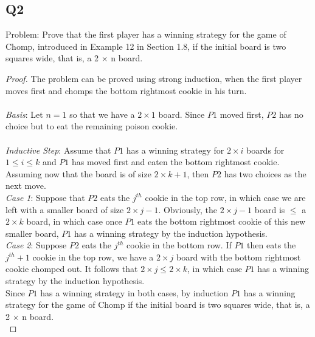 \documentclass[12pt, oneside]{article}
\begin{document}
\subsection*{Q2}
Problem: Prove that the first player has a winning strategy for the
game of Chomp, introduced in Example 12 in Section 1.8,
if the initial board is two squares wide, that is, a 2 $\times$ n
board.

\begin{proof}
The problem can be proved using strong induction, when the first player moves first and chomps the bottom rightmost cookie in his turn.\\\\
\textit{Basis}: Let $n=1$ so that we have a $2\times1$ board. Since $P1$ moved first, $P2$ has no choice but to eat the remaining poison cookie.\\\\
\textit{Inductive Step}: Assume that $P1$ has a winning strategy for $2\times i$ boards for $1 \leq i \leq k$ and $P1$ has moved first and eaten the bottom rightmost cookie. Assuming now that the board is of size $2\times k+1$, then $P2$ has two choices as the next move.\\

\textit{Case 1}: Suppose that $P2$ eats the $j^{th}$ cookie in the top row, in which case we are left with a smaller board of size $2\times j-1$. Obviously, the $2\times j-1$ board is $\leq$ a $2\times k$ board, in which case once $P1$ eats the bottom rightmost cookie of this new smaller board, $P1$ has a winning strategy by the induction hypothesis.\\

\textit{Case 2}: Suppose $P2$ eats the $j^{th}$ cookie in the bottom row. If $P1$ then eats the $j^{th} + 1$ cookie in the top row, we have a $2\times j$ board with the bottom rightmost cookie chomped out. It follows that $2\times j \leq 2\times k$, in which case $P1$ has a winning strategy by the induction hypothesis.\\
Since $P1$ has a winning strategy in both cases, by induction $P1$ has a winning strategy for the game of Chomp if the initial board is two squares wide, that is, a 2 $\times$ n
board.\\
\end{proof}
\end{document}
